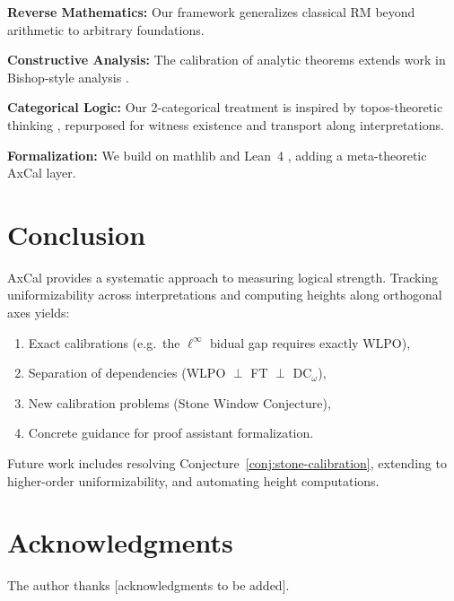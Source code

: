 \documentclass[11pt]{article}
\newcommand{\DCw}{\mathrm{DC}_\omega}
\newcommand{\linf}{\ell^\infty}
\begin{document}
\textbf{Reverse Mathematics:} Our framework generalizes classical RM \cite{Simpson} beyond arithmetic to arbitrary foundations.

\textbf{Constructive Analysis:} The calibration of analytic theorems extends work in Bishop-style analysis \cite{Bishop,BR}.

\textbf{Categorical Logic:} Our 2-categorical treatment is inspired by topos-theoretic thinking \cite{Johnstone}, repurposed for witness existence and transport along interpretations.

\textbf{Formalization:} We build on mathlib \cite{mathlib} and Lean~4 \cite{Lean4}, adding a meta-theoretic AxCal layer.

\section{Conclusion}

AxCal provides a systematic approach to measuring logical strength. Tracking uniformizability across interpretations and computing heights along orthogonal axes yields:
\begin{enumerate}
\item Exact calibrations (e.g.\ the $\linf$ bidual gap requires exactly WLPO),
\item Separation of dependencies (WLPO $\perp$ FT $\perp$ $\DCw$),
\item New calibration problems (Stone Window Conjecture),
\item Concrete guidance for proof assistant formalization.
\end{enumerate}

\noindent Future work includes resolving Conjecture~\ref{conj:stone-calibration}, extending to higher-order uniformizability, and automating height computations.

\section*{Acknowledgments}

The author thanks [acknowledgments to be added].
\end{document}
